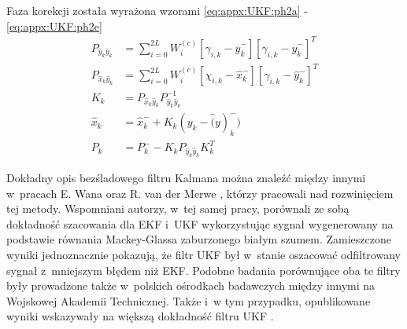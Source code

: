 Faza korekcji została wyrażona wzorami \ref{eq:appx:UKF:ph2a} - \ref{eq:appx:UKF:ph2e}
\begin{subequations}
	\begin{align}
		P_{\widehat{y}_k\widehat{y}_k} & = \sum_{i=0}^{2L}W_i^{(c)}[\gamma_{i,k} - \widehat{y}^-_k][\gamma_{i,k} - \widehat{y}^-_k]^T\label{eq:appx:UKF:ph2a} \\
		P_{\widehat{x}_k\widehat{y}_k} & = \sum_{i=0}^{2L}W_i^{(c)}[\chi_{i,k} - \widehat{x}^-_k][\gamma_{i,k} - \widehat{y}^-_k]^T\label{eq:appx:UKF:ph2b}   \\
		K_k                            & = P_{\widehat{x}_k\widehat{y}_k} P^{-1}_{\widehat{y}_k\widehat{y}_k} \label{eq:appx:UKF:ph2c}                        \\
		\widehat{x}_k                  & = \widehat{x}^-_{k} + K_k(y_k - \widehat(y)^-_k) \label{eq:appx:UKF:ph2d}                                            \\
		P_k                            & = P^-_k - K_kP_{\widehat{y}_k\widehat{y}_k}K_k^T \label{eq:appx:UKF:ph2e}                                            
	\end{align}
\end{subequations}
		
		
Dokładny opis bezśladowego filtru Kalmana można znaleźć między innymi w~pracach E. Wana oraz R. van der Merwe \cite{Wan2000, Wan2001}, którzy pracowali nad rozwinięciem tej metody. Wspomniani autorzy, w~tej samej pracy, porównali ze sobą dokładność szacowania dla EKF i~UKF wykorzystując sygnał wygenerowany na podstawie równania Mackey-Glassa \cite{Glass2010} zaburzonego białym szumem. Zamieszczone wyniki jednoznacznie pokazują, że filtr UKF był w~stanie oszacować odfiltrowany sygnał z~mniejszym błędem niż EKF. Podobne badania porównujące oba te filtry były prowadzone także w~polskich ośrodkach badawczych między innymi na Wojskowej Akademii Technicznej. Także i~w tym przypadku, opublikowane wyniki wskazywały na większą dokładność filtru UKF \cite{Konatowski2007, Konatowski2007a}.
		
